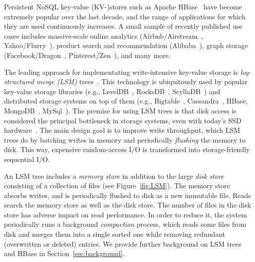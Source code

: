
Persistent NoSQL key-value (KV-)stores such as Apache HBase~\cite{hbase} have become extremely popular over the last decade, 
and the range of applications for which they are used continuously increases. A small sample of  recently 
published use cases includes massive-scale online analytics (Airbnb/Airstream~\cite{airbnb}, 
Yahoo/Flurry~\cite{flurry}), product search 
and recommendation (Alibaba~\cite{alibabahbase}), 
graph storage (Facebook/Dragon~\cite{dragon}, 
Pinterest/Zen~\cite{zen}), and many more. 

The leading approach for implementating write-intensive key-value storage is \emph{log-structured merge (LSM)} trees~\cite{O'Neil:1996}.
This technology is ubiquitously used by popular key-value storage libraries (e.g., LevelDB~\cite{leveldb}, 
RocksDB~\cite{rocksdb}, ScyllaDB~\cite{scylladb}) and distributed storage systems on top 
of them (e.g., Bigtable~\cite{Chang2008}, Cassandra~\cite{cassandra}, HBase, 
MongoDB~\cite{mongodb}, MySql~\cite{mysql}). 
The premise for using LSM trees is that disk access is considered the principal bottleneck in storage systems, even with today's SSD hardware~\cite{rocksdb,Tanenbaum:2014:MOS:2655363,Wu:2012:AWB:2093139.2093140}. 
The main design goal is to improve write throughput, which LSM trees do by batching writes in memory 
and periodically \emph{flushing} the memory  to disk. This way, expensive random-access I/O is transformed 
into storage-friendly sequential I/O. 

An LSM tree includes a \emph{memory store} in addition to the large \emph{disk store} consisting of a collection of files
(see Figure~\ref{fig:LSM}). 
The memory store absorbs writes, and is periodically flushed to disk as a new immutable file. Reads search the memory store
as well as the disk store. The number of files in the disk store has adverse impact on read performance. 
In order to reduce it, the system periodically runs a background \emph{compaction} process, which reads some files from 
disk and merges them into a single sorted one while removing redundant (overwritten or deleted) entries.
We provide further background on LSM trees and HBase in Section~\ref{sec:background}.

